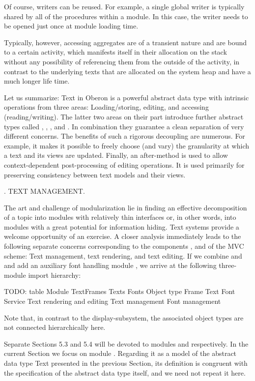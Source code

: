 \noindent Of course, writers can be reused. For example, a single global writer
is typically shared by all of the procedures within a module. In this
case, the writer needs to be opened just once at module loading time.

Typically, however, accessing aggregates are of a transient nature and
are bound to a certain activity, which manifests itself in their
allocation on the stack without any possibility of referencing them
from the outside of the activity, in contrast to the underlying texts
that are allocated on the system heap and have a much longer life
time.

Let us summarize: Text in Oberon is a powerful abstract data type with
intrinsic operations from three areas: Loading/storing, editing, and
accessing (reading/writing). The latter two areas on their part
introduce further abstract types called , , , and
. In combination they guarantee a clean separation of very
different concerns. The benefits of such a rigorous decoupling are
numerous. For example, it makes it possible to freely choose (and
vary) the granularity at which a text and its views are
updated. Finally, an after-method is used to allow context-dependent
post-processing of editing operations. It is used primarily for
preserving consistency between text models and their views.

. TEXT MANAGEMENT.

The art and challenge of modularization lie in finding an effective
decomposition of a topic into modules with relatively thin interfaces
or, in other words, into modules with a great potential for
information hiding. Text systems provide a welcome opportunity of an
exercise. A closer analysis immediately leads to the following
separate concerns corresponding to the components ,  and
 of the MVC scheme: Text management, text rendering, and
text editing. If we combine  and  and add an auxiliary
font handling module , we arrive at the following three-module
import hierarchy:

TODO: table
Module
TextFrames Texts
Fonts
Object type
Frame Text Font
Service
Text rendering and editing Text management
Font management

Note that, in contrast to the display-subsystem, the associated object
types are not connected hierarchically here.

Separate Sections 5.3 and 5.4 will be devoted to modules 
and  respectively. In the current Section
we focus on module . Regarding it as a model of the
abstract data type Text presented in the previous Section, its
definition is congruent with the specification of the abstract data
type itself, and we need not repeat it here.

